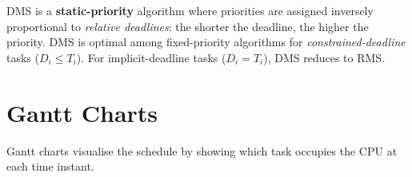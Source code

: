 \begin{definition}
DMS is a \textbf{static-priority} algorithm where priorities are assigned inversely proportional to \emph{relative deadlines}: the shorter the deadline, the higher the priority. DMS is optimal among fixed-priority algorithms for \emph{constrained-deadline} tasks ($D_i \leq T_i$). For implicit-deadline tasks ($D_i = T_i$), DMS reduces to RMS.
\end{definition}

\section{Gantt Charts}
\label{sec:sched:gantt}

Gantt charts visualise the schedule by showing which task occupies the CPU at each time instant.

